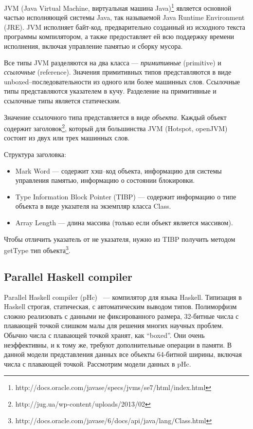JVM (Java Virtual Machine, виртуальная машина Java)\footnote{http://docs.oracle.com/javase/specs/jvms/se7/html/index.html}
является основной частью исполняющей системы Java, так называемой Java Runtime Environment (JRE).
JVM исполняет байт-код, предварительно созданный из исходного текста программы компилятором, а также
предоставляет ей всю поддержку времени исполнения, включая управление памятью и сборку мусора.

Все типы JVM разделяются на два класса --- \emph{примитивные} (primitive) и \emph{ссылочные} (reference).
Значения примитивных типов представляются в виде unboxed--последовательности из одного или более машинных слов.
Ссылочные типы представляются указателем в кучу. Разделение на примитивные и ссылочные типы является статическим.

Значение ссылочного типа представляется в виде \emph{объекта}.
Каждый объект содержит заголовок\footnote{http://jug.ua/wp-content/uploads/2013/02}, который для 
большинства JVM (Hotspot, openJVM) состоит из двух или трех машинных слов.

Структура заголовка:

\begin{itemize}
\item Mark Word --- содержит хэш--код объекта, информацию для системы управления памятью, информацию о состоянии блокировки. 
\item Type Information Block Pointer (TIBP) --- содержит информацию о типе объекта в виде указателя на экземпляр класса Class.
\item Array Length --- длина массива (только если объект является массивом).
\end{itemize}            

Чтобы отличить указатель от не указателя, нужно из TIBP получить методом getType тип объекта\footnote{http://docs.oracle.com/javase/6/docs/api/java/lang/Class.html}.

\subsection {Parallel Haskell compiler}

Parallel Haskell compiler (pHc)~\cite{pHc} — компилятор для языка Haskell.
Типизация в Haskell строгая, статическая, с автоматическим выводом типов.
Полиморфизм сложно реализовать с данными не фиксированного размера, 32-битные
числа с плавающей точкой слишком малы для решения многих научных проблем. Обычно
числа с плавающей точкой хранят, как ``boxed''. 
Они очень неэффективны, и к тому же, требуют дополнительные операции в памяти.
В данной модели представления данных все объекты 64-битной ширины, включая числа с плавающей точкой.
Рассмотрим модели данных в pHc.

